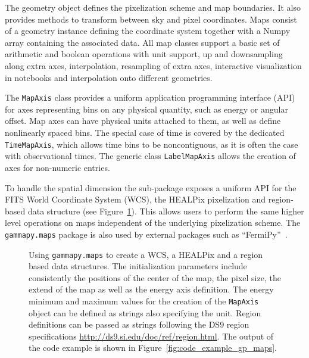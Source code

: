 \documentclass[longauth]{aa}
\newcommand{\code}[1]{\texttt{#1}}
\newcommand{\numpy}{Numpy\xspace}
\begin{document}
The geometry object defines the pixelization scheme and map boundaries. It also
provides methods to transform between sky and pixel coordinates. Maps consist
of a geometry instance defining the coordinate system together with a
\numpy array containing the associated data. All map classes support a basic
set of arithmetic and boolean operations with  unit support, up and downsampling
along extra axes, interpolation, resampling of extra axes, interactive visualization
in notebooks and interpolation onto different geometries.

The \code{MapAxis} class provides a uniform application programming interface
(API) for axes representing
bins on any physical quantity, such as energy or angular offset.
Map axes can have physical units attached to them, as well as define
nonlinearly spaced bins. The special case of time is covered by the
dedicated \code{TimeMapAxis}, which allows time bins to be noncontiguous,
as it is often the case with observational times. The generic
class \code{LabelMapAxis} allows the creation of axes for non-numeric entries.

To handle the spatial dimension the sub-package exposes a uniform API for
the FITS World Coordinate System (WCS), the HEALPix pixelization and
region-based data structure (see Figure~\ref{fig*:minted:gp_maps}).
This allows users to perform the same higher level operations on maps
independent of the underlying pixelization scheme. The \code{gammapy.maps}
package is also used by external packages such as \enquote{FermiPy}~\citep{Wood2017}.

\begin{figure}
        \small

        \caption{
        Using \code{gammapy.maps} to create a WCS, a HEALPix and a region
                based data structures. The initialization parameters include
        consistently the positions of the center of the map, the pixel
        size, the extend of the map as well as the energy axis definition.
        The energy minimum and maximum values for the creation of the
        \code{MapAxis} object can be defined as strings also specifying the
        unit. Region definitions can be passed as strings following
        the DS9 region specifications \url{http://ds9.si.edu/doc/ref/region.html}. The output
                of the code example is shown in Figure~\ref{fig:code_example_gp_maps}.
        }
    \label{fig*:minted:gp_maps}
\end{figure}
\end{document}

